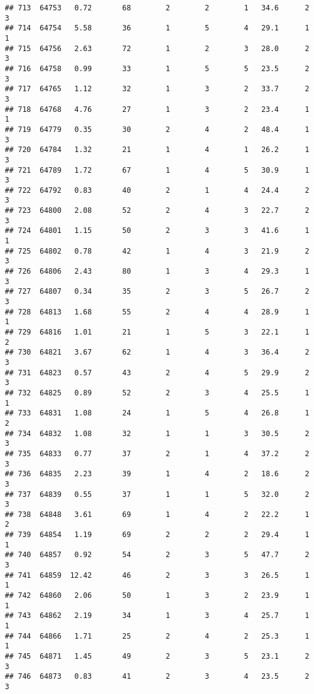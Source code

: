 \documentclass[
]{article}
\begin{document}
\begin{verbatim}
## 713  64753   0.72       68        2        2        1   34.6      2      3
## 714  64754   5.58       36        1        5        4   29.1      1      1
## 715  64756   2.63       72        1        2        3   28.0      2      3
## 716  64758   0.99       33        1        5        5   23.5      2      3
## 717  64765   1.12       32        1        3        2   33.7      2      3
## 718  64768   4.76       27        1        3        2   23.4      1      1
## 719  64779   0.35       30        2        4        2   48.4      1      3
## 720  64784   1.32       21        1        4        1   26.2      1      3
## 721  64789   1.72       67        1        4        5   30.9      1      3
## 722  64792   0.83       40        2        1        4   24.4      2      3
## 723  64800   2.08       52        2        4        3   22.7      2      3
## 724  64801   1.15       50        2        3        3   41.6      1      1
## 725  64802   0.78       42        1        4        3   21.9      2      3
## 726  64806   2.43       80        1        3        4   29.3      1      3
## 727  64807   0.34       35        2        3        5   26.7      2      3
## 728  64813   1.68       55        2        4        4   28.9      1      1
## 729  64816   1.01       21        1        5        3   22.1      1      2
## 730  64821   3.67       62        1        4        3   36.4      2      3
## 731  64823   0.57       43        2        4        5   29.9      2      3
## 732  64825   0.89       52        2        3        4   25.5      1      1
## 733  64831   1.08       24        1        5        4   26.8      1      2
## 734  64832   1.08       32        1        1        3   30.5      2      3
## 735  64833   0.77       37        2        1        4   37.2      2      3
## 736  64835   2.23       39        1        4        2   18.6      2      3
## 737  64839   0.55       37        1        1        5   32.0      2      3
## 738  64848   3.61       69        1        4        2   22.2      1      2
## 739  64854   1.19       69        2        2        2   29.4      1      1
## 740  64857   0.92       54        2        3        5   47.7      2      3
## 741  64859  12.42       46        2        3        3   26.5      1      1
## 742  64860   2.06       50        1        3        2   23.9      1      1
## 743  64862   2.19       34        1        3        4   25.7      1      1
## 744  64866   1.71       25        2        4        2   25.3      1      1
## 745  64871   1.45       49        2        3        5   23.1      2      3
## 746  64873   0.83       41        2        3        4   23.5      2      3

\end{verbatim}
\end{document}
